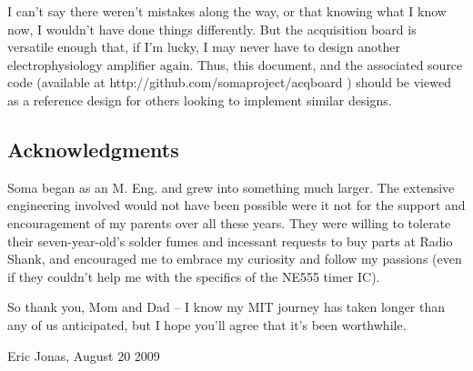 I can't say there weren't mistakes along the way, or that knowing what
I know now, I wouldn't have done things differently. But the
acquisition board is versatile enough that, if I'm lucky, I may never
have to design another electrophysiology amplifier again. Thus, this
document, and the associated source code (available at
http://github.com/somaproject/acqboard ) should be viewed as a
reference design for others looking to implement similar designs.



\subsection*{Acknowledgments}

Soma began as an M. Eng. and grew into something much
larger. The extensive engineering involved would not have been
possible were it not for the support and encouragement of my parents
over all these years. They were willing to tolerate their seven-year-old's
solder fumes and incessant requests to buy parts at Radio Shank, and
encouraged me to embrace my curiosity and follow my passions (even
if they couldn't help me with the specifics of the NE555 timer IC). 

So thank you, Mom and Dad -- I know my MIT journey has taken longer
than any of us anticipated, but I hope you'll agree that it's been
worthwhile.

\vspace{0.5in}
Eric Jonas, 
August 20 2009
